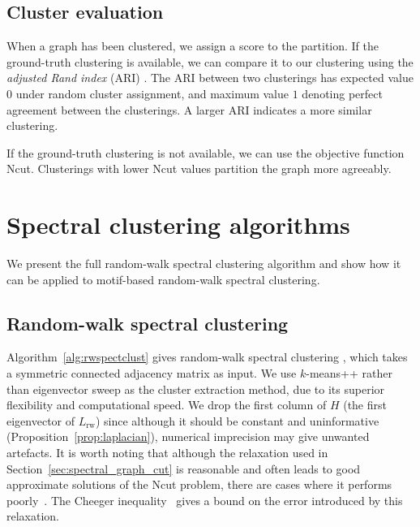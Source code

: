 \documentclass[12pt,draft]{ociamthesis}
\theoremstyle{plain}
\theoremstyle{definition}
\theoremstyle{remark}
\begin{document}
\subsection{Cluster evaluation}

When a graph has been clustered, we assign a score to the partition. If the
ground-truth clustering is available, we can compare it to our clustering using
the \emph{adjusted Rand index} (ARI) \cite{hubert1985comparing}. The ARI
between two clusterings has expected value $0$ under random cluster assignment,
and maximum value $1$ denoting perfect agreement between the clusterings. A
larger ARI indicates a more similar clustering.

If the ground-truth clustering is not available, we can use the objective
function Ncut. Clusterings with lower Ncut values partition the graph more
agreeably.

\section{Spectral clustering algorithms} \label{sec:spectral_algs}

We present the full random-walk spectral clustering algorithm and show how it
can be applied to motif-based random-walk spectral clustering.

\subsection{Random-walk spectral clustering}

Algorithm~\ref{alg:rwspectclust} gives random-walk spectral clustering
\cite{von2007tutorial}, which takes a symmetric connected adjacency matrix as
input. We use $k$-means++ rather than eigenvector sweep as the cluster
extraction method, due to its superior flexibility and computational speed. We
drop the first column of $H$ (the first eigenvector of $L_\mathrm{rw}$) since
although it should be constant and uninformative
(Proposition~\ref{prop:laplacian}), numerical imprecision may give unwanted
artefacts. It is worth noting that although the relaxation used in
Section~\ref{sec:spectral_graph_cut} is reasonable and often leads to good
approximate solutions of the Ncut problem, there are cases where it performs
poorly~\cite{guattery1998quality}. The Cheeger
inequality~\cite{chung2005laplacians} gives a bound on the error introduced by
this relaxation.
\end{document}
